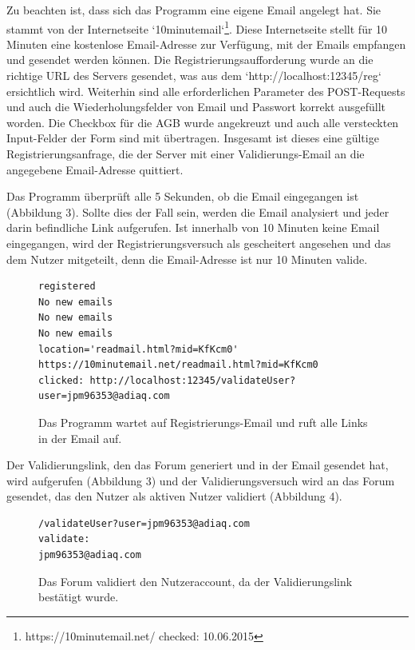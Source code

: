 Zu beachten ist, dass sich das Programm eine eigene Email angelegt hat. Sie stammt von der Internetseite `10minutemail`\footnote{https://10minutemail.net/ checked: 10.06.2015}.
Diese Internetseite stellt für 10 Minuten eine kostenlose Email-Adresse zur Verfügung, mit der Emails empfangen und gesendet werden können. Die Registrierungsaufforderung wurde an die richtige URL des Servers gesendet, was aus dem `http://localhost:12345/reg` ersichtlich wird. Weiterhin sind alle erforderlichen Parameter des POST-Requests und auch die Wiederholungsfelder von Email und Passwort korrekt ausgefüllt worden. Die Checkbox für die AGB wurde angekreuzt und auch alle versteckten Input-Felder der Form sind mit übertragen. Insgesamt ist dieses eine gültige Registrierungsanfrage, die der Server mit einer Validierungs-Email an die angegebene Email-Adresse quittiert.

Das Programm überprüft alle 5 Sekunden, ob die Email eingegangen ist (Abbildung 3). Sollte dies der Fall sein, werden die Email analysiert und jeder darin befindliche Link aufgerufen. Ist innerhalb von 10 Minuten keine Email eingegangen, wird der Registrierungsversuch als gescheitert angesehen und das dem Nutzer mitgeteilt, denn die Email-Adresse ist nur 10 Minuten valide.

\begin{figure}[ht]
\begin{lstlisting}[language=HTML5]
registered
No new emails
No new emails
No new emails
location='readmail.html?mid=KfKcm0'
https://10minutemail.net/readmail.html?mid=KfKcm0
clicked: http://localhost:12345/validateUser?user=jpm96353@adiaq.com
\end{lstlisting}
\caption{Das Programm wartet auf Registrierungs-Email und ruft alle Links in der Email auf.}
\end{figure}

Der Validierungslink, den das Forum generiert und in der Email gesendet hat, wird aufgerufen (Abbildung 3) und der Validierungsversuch wird an das Forum gesendet, das den Nutzer als aktiven Nutzer validiert (Abbildung 4).

\begin{figure}[ht]
\begin{lstlisting}[language=HTML5]
/validateUser?user=jpm96353@adiaq.com
validate:
jpm96353@adiaq.com
\end{lstlisting}
\caption{Das Forum validiert den Nutzeraccount, da der Validierungslink bestätigt wurde.}
\end{figure}

